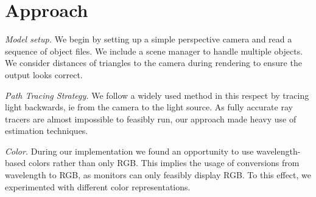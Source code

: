 \documentclass[../main.tex]{subfiles}
\begin{document}
\section{Approach}

\emph{Model setup.} We begin by setting up a simple perspective camera and read a sequence of object files. 
We include a scene manager to handle multiple objects. We consider distances of
triangles to the camera during rendering to ensure the output looks correct.

\emph{Path Tracing Strategy.} We follow a widely used method in this respect by
tracing light backwards, ie from the camera to the light source. As fully
accurate ray tracers are almost impossible to feasibly run, our approach made
heavy use of estimation techniques.

\emph{Color.} During our implementation we found an opportunity to use
wavelength-based colors rather than only RGB. This implies the usage of
conversions from wavelength to RGB, as monitors can only feasibly display RGB.
To this effect, we experimented with different color representations.

\ifSubfilesClassLoaded{%
    \nocite{*}
    \twocolumn
}{}
\end{document}
